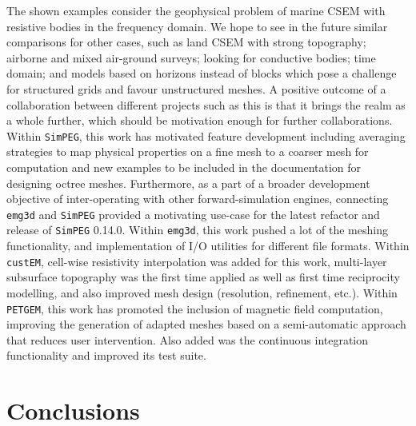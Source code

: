 \documentclass[
    paper,
  ]{geophysics}
\newcommand{\emg}[2]{\texttt{emg#1#2}\xspace}
\newcommand{\simpeg}{\texttt{SimPEG}\xspace}
\newcommand{\custem}{\texttt{custEM}\xspace}
\newcommand{\petgem}{\texttt{PETGEM}\xspace}
\begin{document}
The shown examples consider the geophysical problem of marine CSEM with resistive bodies in the frequency domain. We hope to see in the future similar comparisons for other cases, such as land CSEM with strong topography; airborne and mixed air-ground surveys; looking for conductive bodies; time domain; and models based on horizons instead of blocks which pose a challenge for structured grids and favour unstructured meshes. A positive outcome of a collaboration between different projects such as this is that it brings the realm as a whole further, which should be motivation enough for further collaborations. Within \simpeg, this work has motivated feature development including averaging strategies to map physical properties on a fine mesh to a coarser mesh for computation and new examples to be included in the documentation for designing octree meshes. Furthermore, as a part of a broader development objective of inter-operating with other forward-simulation engines, connecting \emg3d and \simpeg provided a motivating use-case for the latest refactor and release of \simpeg 0.14.0. Within \emg3d, this work pushed a lot of the meshing functionality, and implementation of I/O utilities for different file formats. Within \custem, cell-wise resistivity interpolation was added for this work, multi-layer subsurface topography was the first time applied as well as first time reciprocity modelling, and also improved mesh design (resolution, refinement, etc.). Within \petgem, this work has promoted the inclusion of magnetic field computation, improving the generation of adapted meshes based on a semi-automatic approach that reduces user intervention. Also added was the continuous integration functionality and improved its test suite.

\section{Conclusions}
\end{document}
